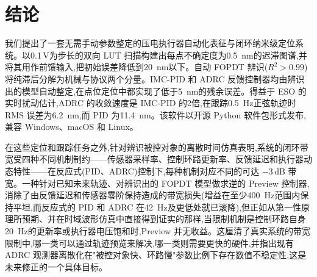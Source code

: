 \documentclass[fleqn,10pt]{wlscirep}
\begin{document}
\section*{结论}

我们提出了一套无需手动参数整定的压电执行器自动化表征与闭环纳米级定位系统。以0.1\,V为步长的双向 LUT 扫描构建出每点不确定度为\SI{0.5}{nm}的迟滞图谱,并将其用作前馈输入,把初始误差降低到\SI{20}{nm}以下。自动 FOPDT 辨识($R^2 > 0.99$)将纯滞后分解为机械与协议两个分量。IMC-PID 和 ADRC 反馈控制器均由辨识出的模型自动整定,在点位定位中都实现了低于\SI{5}{nm}的残余误差。得益于 ESO 的实时扰动估计,ADRC 的收敛速度是 IMC-PID 的2倍,在跟踪\SI{0.5}{Hz}正弦轨迹时 RMS 误差为\SI{6.2}{nm},而 PID 为\SI{11.4}{nm}。该软件以开源 Python 软件包形式发布,兼容 Windows、macOS 和 Linux。

在这些定位和跟踪任务之外,针对辨识被控对象的离散时间仿真表明,系统的闭环带宽受四种不同机制制约——传感器采样率、控制环路更新率、反馈延迟和执行器动态特性——在反应式(PID、ADRC)控制下,每种机制对应不同的可达 $-3$\,dB 带宽。一种针对已知未来轨迹、对辨识出的 FOPDT 模型做求逆的 Preview 控制器,消除了由反馈延迟和传感器零阶保持造成的带宽损失(增益在至少\SI{400}{Hz}范围内保持平坦,而反应式的 PID 和 ADRC 在\SI{42}{Hz}及更低处就已滚降),但正如从第一性原理所预期、并在时域波形仿真中直接得到证实的那样,当限制机制是控制环路自身\SI{20}{Hz}的更新率或执行器电压饱和时,Preview 并无收益。这厘清了真实系统的带宽限制中,哪一类可以通过轨迹预览来解决,哪一类则需要更快的硬件,并指出现有 ADRC 观测器离散化在"被控对象快、环路慢"参数比例下存在数值不稳定性,这是未来修正的一个具体目标。


%
\end{document}
